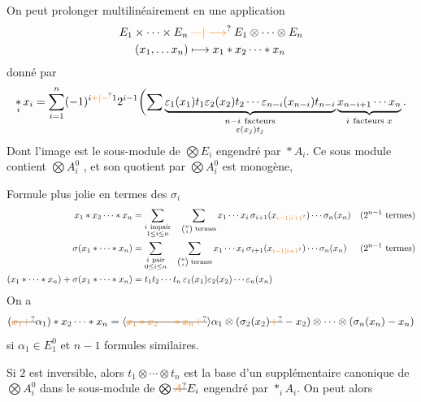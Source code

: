 On peut prolonger multilinéairement en une application
\[
 \begin{aligned}
 E_1\times\cdots\times E_n&\mathbin{\unsure{\text{---}|\longrightarrow}} E_1\otimes\cdots\otimes E_n\\
 (x_1,\ldots x_n)&\longmapsto x_1\ast x_2\cdots\ast x_n
 \end{aligned}
\]
donné par
\[
 \mathop{\ast}_{i}x_i=\sum_{i=1}^{n}(-1)^{i\unsure{+|-}1}2^{i-1}
 \biggl(\sum\underbrace{\varepsilon_1(x_1)t_1\varepsilon_2(x_2)t_2\cdots\varepsilon_{n-i}(x_{n-i})t_{n-i}}_{\substack{n-i\ \text{facteurs}\\\varepsilon(x_j)t_j}}
 \underbrace{x_{n-i+1}\cdots x_n}_{i\ \text{facteurs }x}.
\]
Dont l'image est le sous-module de $\bigotimes E_i$ engendré par $\mathop{\ast}A_i$. Ce sous module  contient  $\bigotimes A_i^0$ , et son quotient par $\bigotimes A_i^0$ est monogène, 

Formule plus jolie en termes des $\sigma_i$
\[
 \begin{aligned}
 x_1\ast x_2\cdots\ast x_n
 &=\sum_{\substack{i\ \text{impair}\\1\leq i\leq n}}\quad\sum_{\binom ni\text{ termes}}
 x_1\cdots x_i\,\sigma_{i+1}(x_{\unsure{i-1|i+1}})\cdots\sigma_n(x_n)
 &&(2^{n-1}\text{ termes})\\
 \sigma(x_1\ast\cdots\ast x_n)
 &=\sum_{\substack{i\ \text{pair}\\0\leq i\leq n}}\quad\sum_{\binom ni\text{ termes}}
 x_1\cdots x_i\,\sigma_{i+1}(x_{\unsure{i-1|i+1}})\cdots\sigma_n(x_n)
 &&(2^{n-1}\text{ termes})\\
 (x_1\ast\cdots\ast x_n)+\sigma(x_1\ast\cdots\ast x_n)
 &=t_1t_2\cdots t_n\,\varepsilon_1(x_1)\varepsilon_2(x_2)\cdots\varepsilon_n(x_n)
 \end{aligned}
\]
On a
\[
 (\deleted{\unsure{x_1+}}\alpha_1)\ast x_2\cdots\ast x_n=\inserted{\deleted{\unsure{x_1\ast x_2\cdots\ast x_n+}}}\alpha_1\otimes(\sigma_2(x_2)\deleted{\unsure{+}}-x_2)\otimes\cdots\otimes(\sigma_n(x_n)-x_n)
\]
si $\alpha_1\in E_1^0$ et $n-1$ formules similaires.

Si $2$ est inversible, alors $t_1\otimes\cdots\otimes t_n$ est la base d'un supplémentaire canonique de $\bigotimes A_i^0$ dans le sous-module  de $\bigotimes \deleted{\unsure{A}}E_i$ engendré par $\mathop{\ast}_i A_i$. On peut alors

